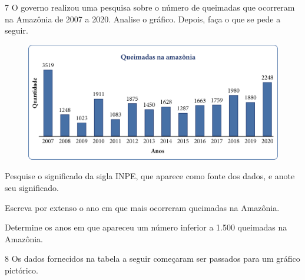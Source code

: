 
\pagebreak
\num{7} O governo realizou uma pesquisa sobre o número de queimadas que
ocorreram na Amazônia de 2007 a 2020. Analise o gráfico. Depois, faça o que se pede a seguir.


\begin{figure}[htpb!]
\centering
\includegraphics[width=\textwidth]{media/image46.png}
\end{figure}

\begin{escolha}
\item
  Pesquise o significado da sigla INPE, que aparece como fonte dos dados,
  e anote seu significado.


\item
  Escreva por extenso o ano em que mais ocorreram queimadas na Amazônia.


\item
  Determine os anos em que apareceu um número inferior a 1.500 queimadas na
  Amazônia.

\end{escolha}


\pagebreak
\num{8} Os dados fornecidos na tabela a seguir começaram ser passados para um
gráfico pictórico.


